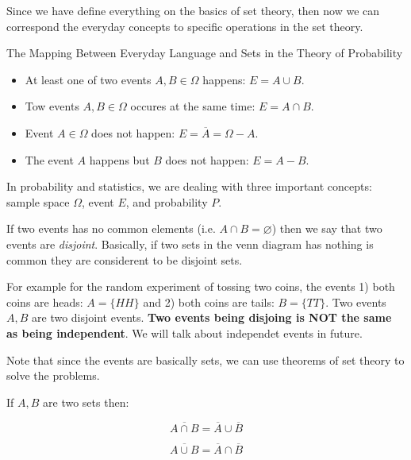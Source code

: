 Since we have define everything on the basics of set theory, then now we can correspond the everyday concepts to specific operations in the set theory.

\begin{example}{The Mapping Between Everyday Language and Sets in the Theory of Probability}
	
	\begin{itemize}
		\item At least one of two events $A,B \in \Omega$ happens: $E = A \cup B$.
		\item Tow events $A,B \in \Omega$ occures at the same time: $E = A \cap B$.
		\item Event $A \in \Omega$ does not happen: $E = \overline{A} = \Omega - A$.
		\item The event $A$ happens but $B$ does not happen: $E = A - B$.
		
	\end{itemize}
	
\end{example}



In probability and statistics, we are dealing with three important concepts: sample space $\Omega$, event $E$, and probability $P$.


\begin{definition}
	
	If two events has no common elements (i.e. $A \cap B = \varnothing$) then we say that two events are \emph{disjoint}. Basically, if two sets in the venn diagram has nothing is common they are considerent to be disjoint sets.
	
	
	For example for the random experiment of tossing two coins, the events 1) both coins are heads: $A = \{HH\}$ and 2) both coins are tails: $B = \{TT\}$. Two events $A,B$  are two disjoint events. \textbf{Two events being  disjoing is NOT the same as being independent}. We will talk about independet events in future.
	
\end{definition}

Note that since the events are basically sets, we can use theorems of set theory to solve the problems. 

\begin{theorem}
	
	If $A,B$ are two sets then:
	
	$$\overline{A \cap B} = \overline{A} \cup \overline{B}$$
	
	$$\overline{A \cup B} = \overline{A} \cap \overline{B}$$
	
\end{theorem}

